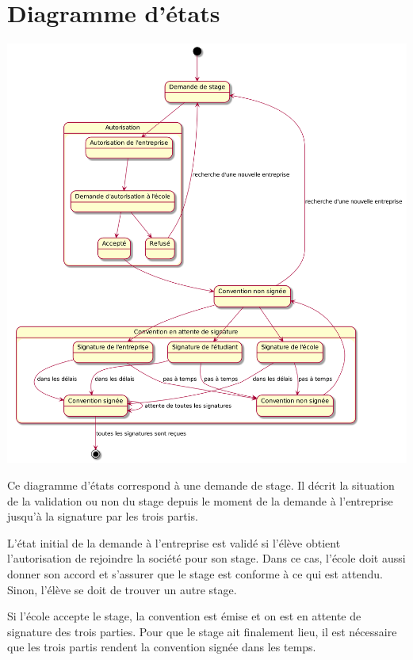 \documentclass[11pt, a4paper]{report}
\begin{document}
\chapter*{Diagramme d'états}
\centerline{\includegraphics[scale=0.35]{Images/diagrammedetats.png}}
\hspace{1cm}Ce diagramme d’états correspond à une demande de stage. Il décrit la situation de la validation ou non du stage depuis le moment de la demande à l’entreprise jusqu’à la signature par les trois partis.\vspace{0.2cm}

\hspace{0.6cm}L’état initial de la demande à l’entreprise est validé si l’élève obtient l’autorisation de rejoindre la société pour son stage. Dans ce cas, l’école doit aussi donner son accord et s’assurer que le stage est conforme à ce qui est attendu. Sinon, l’élève se doit de trouver un autre stage.\vspace{0.2cm}

\hspace{0.6cm}Si l’école accepte le stage, la convention est émise et on est en attente de signature des trois parties. Pour que le stage ait finalement lieu, il est nécessaire que les trois partis rendent la convention signée dans les temps.
\end{document}
